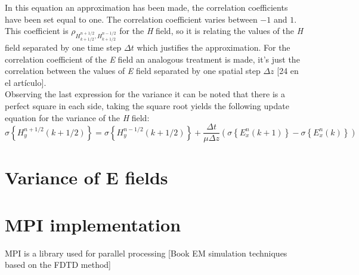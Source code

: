\documentclass[12pt, oneside]{book}
\begin{document}
In this equation an approximation has been made, the correlation coefficients have been set equal to one. The correlation coefficient varies between $-1$ and $1$. This coefficient is $\rho_{H_{k+1/2}^{n+1/2},H_{k+1/2}^{n-1/2}}$ for the \textit{H} field, so it is relating the values of the \textit{H} field separated by one time step $\Delta t$ which justifies the approximation. For the correlation coefficient of the \textit{E} field an analogous treatment is made, it's just the correlation between the values of \textit{E} field separated by one spatial step $\Delta z$ [24 en el artículo]. \\
\indent Observing the last expression for the variance it can be noted that there is a perfect square in each side, taking the square root yields the following update equation for the variance of the \textit{H} field:
\begin{equation}
\sigma\left\lbrace H_y^{n+1/2}(k+1/2) \right\rbrace = \sigma\left\lbrace H_y^{n-1/2}(k+1/2)\right\rbrace + \frac{\Delta t}{\mu \Delta z}\left(\sigma \left\lbrace E_x^n(k+1)\right\rbrace -\sigma\left\lbrace E_x^n(k)\right\rbrace \right)
\end{equation}
\section{Variance of E fields}

\section{MPI implementation}
MPI is a library used for parallel processing [Book EM simulation techniques based on the FDTD method]
\end{document}
